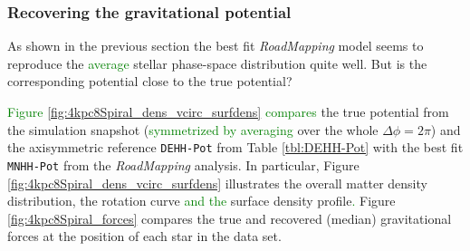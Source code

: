 \documentclass[iop,revtex4,numberedappendix,appendixfloats]{emulateapj}
\newcommand{\RM}{{\sl RoadMapping}}
\newcommand{\NEW}[1]{\textcolor{Green}{#1}}
\newcommand{\OLD}[1]{}
\begin{document}
\subsubsection{Recovering the gravitational potential} \label{sec:4kpc8Spiral_potential}

As shown in the previous section the best fit \RM{} model seems to reproduce the \NEW{average} stellar phase-space distribution quite well. But is the corresponding potential close to the true potential? 

\OLD{Figures \ref{fig:4kpc8Spiral_density}, \ref{fig:4kpc8Spiral_vcirc_surfdens} and \ref{fig:4kpc8Spiral_forces} compare}\NEW{Figure \ref{fig:4kpc8Spiral_dens_vcirc_surfdens} compares} the true potential from the simulation snapshot (\OLD{averaged}\NEW{symmetrized by averaging} over the whole $\Delta\phi=2\pi$) and the axisymmetric reference \texttt{DEHH-Pot} from Table \ref{tbl:DEHH-Pot} with the best fit \texttt{MNHH-Pot} from the \RM{} analysis. In particular, Figure \OLD{\ref{fig:4kpc8Spiral_density}}\NEW{\ref{fig:4kpc8Spiral_dens_vcirc_surfdens}} illustrates the overall matter density distribution, \OLD{Figure \ref{fig:4kpc8Spiral_vcirc_surfdens} }the rotation curve\OLD{,} \NEW{and the} surface density profile\NEW{.}\OLD{ and halo-to-disk ratio and} Figure \ref{fig:4kpc8Spiral_forces} compares the true and recovered (median) gravitational forces at the position of each star in the data set.
\end{document}
